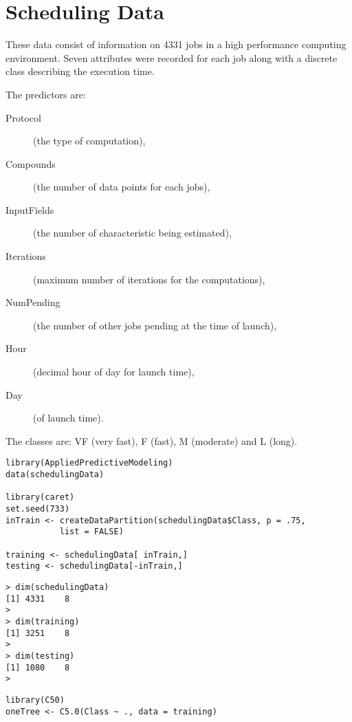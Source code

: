 \documentclass[caret-main.tex]{subfiles}
\begin{document}

\section{Scheduling Data}

These data consist of information on 4331 jobs in a high performance computing environment. Seven attributes were recorded for each job along with a discrete class describing the execution time.

\noindent The predictors are:
\begin{description}
\item[Protocol] (the type of computation), \item[Compounds] (the number of data points for each jobs), 
\item[InputFields] (the number of characteristic being estimated), 
\item[Iterations] (maximum number of iterations for the computations), 
\item[NumPending] (the number of other jobs pending at the time of launch), 
\item[Hour] (decimal hour of day for launch time), 
\item[Day] (of launch time).
\end{description} 

The classes are: VF (very fast), F (fast), M (moderate) and L (long).
\newpage
\begin{framed}
\begin{verbatim}
library(AppliedPredictiveModeling)
data(schedulingData)

library(caret)
set.seed(733)
inTrain <- createDataPartition(schedulingData$Class, p = .75, 
		   list = FALSE)
		   
training <- schedulingData[ inTrain,]
testing <- schedulingData[-inTrain,]
\end{verbatim}
\end{framed}

\begin{verbatim}
> dim(schedulingData)
[1] 4331    8
>
> dim(training)
[1] 3251    8
>
> dim(testing)
[1] 1080    8
> 
\end{verbatim}


\newpage
\begin{framed}
\begin{verbatim}
library(C50)
oneTree <- C5.0(Class ~ ., data = training)
\end{verbatim}
\end{framed}
\end{document}
